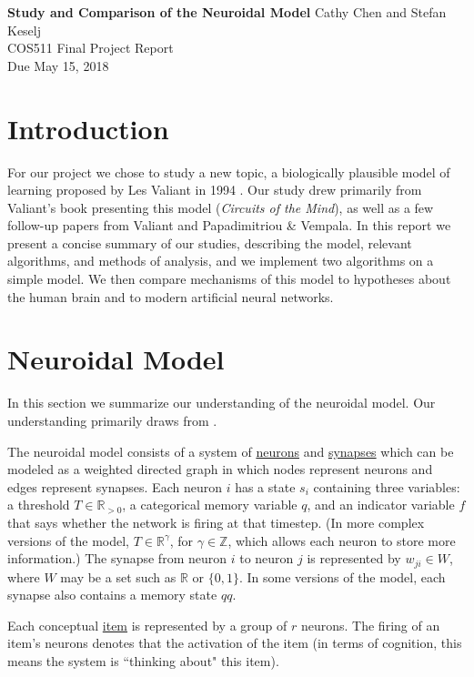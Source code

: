 \documentclass[letterpaper, 12pt]{article}
\begin{document}
\noindent
\textbf{Study and Comparison of the Neuroidal Model} \hfill \newline Cathy Chen and Stefan Keselj \\
COS511 Final Project Report \\
Due May 15, 2018

\section{Introduction}
For our project we chose to study a new topic, a biologically plausible model of learning proposed by Les Valiant in 1994 \cite{valiant_circuits_1994}. Our study drew primarily from Valiant's book presenting this model (\textit{Circuits of the Mind}), as well as a few follow-up papers from Valiant and Papadimitriou \& Vempala. In this report we present a concise summary of our studies, describing the model, relevant algorithms, and methods of analysis, and we implement two algorithms on a simple model. We then compare mechanisms of this model to hypotheses about the human brain and to modern artificial neural networks.

\section{Neuroidal Model}\label{sec:model}
In this section we summarize our understanding of the neuroidal model. Our understanding primarily draws from \cite{valiant_circuits_1994, valiant_memorization_2005, papadimitriou_cortical_2015}.

The neuroidal model consists of a system of \underline{neurons} and \underline{synapses} which can be modeled as a weighted directed graph in which nodes represent neurons and edges represent synapses. Each neuron $i$ has a state $s_i$ containing three variables: a threshold $T\in\mathbb{R}_{>0}$, a categorical memory variable $q$, and an indicator variable $f$ that says whether the network is firing at that timestep. (In more complex versions of the model, $T\in\mathbb{R}^\gamma$, for $\gamma\in\mathbb{Z}$, which allows each neuron to store more information.) The synapse from neuron $i$ to neuron $j$ is represented by $w_{ji}\in W$, where $W$ may be a set such as $\mathbb{R}$ or $\{0,1\}$. In some versions of the model, each synapse also contains a memory state $qq$.

Each conceptual \underline{item} is represented by a group of $r$ neurons. The firing of an item's neurons denotes that the activation of the item (in terms of cognition, this means the system is ``thinking about" this item). 
\end{document}

